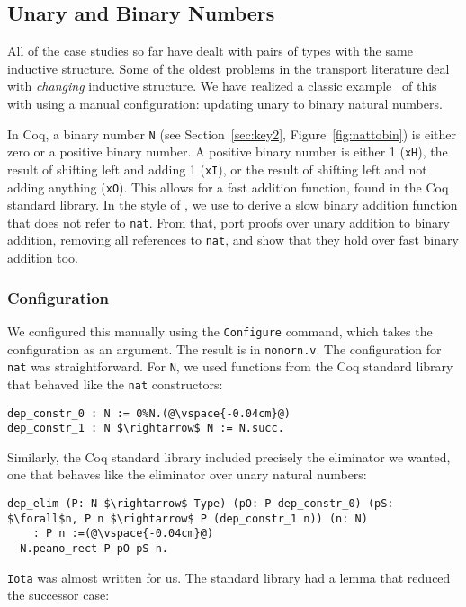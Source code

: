 \subsection{Unary and Binary Numbers}
\label{sec:bin}

All of the case studies so far have dealt with pairs of types with the same inductive structure.
Some of the oldest problems in the transport literature deal with \textit{changing} inductive
structure.
We have realized a classic example~\cite{magaud2000changing}  of this with \toolname using a manual configuration:
updating unary to binary natural numbers.

In Coq, a binary number \lstinline{N} (see Section~\ref{sec:key2}, Figure~\ref{fig:nattobin}) is either zero or a positive binary number. A positive binary number
is either 1 (\lstinline{xH}), the result of shifting left and adding 1 (\lstinline{xI}),
or the result of shifting left and not adding anything (\lstinline{xO}).
This allows for a fast addition function, found in the Coq standard library.
In the style of \citet{magaud2000changing}, we use \toolname to derive a slow binary
addition function that does not refer to \lstinline{nat}.
From that, port proofs over unary addition to binary addition,
removing all references to \lstinline{nat}, and show that they hold over fast binary addition too.

\subsubsection{Configuration}
We configured this manually using the \lstinline{Configure} command,
which takes the configuration as an argument.
The result is in \lstinline{nonorn.v}.
The configuration for \lstinline{nat} was straightforward.
For \lstinline{N}, we used functions from the Coq standard library that
behaved like the \lstinline{nat} constructors:

\begin{lstlisting}
dep_constr_0 : N := 0%N.(@\vspace{-0.04cm}@)
dep_constr_1 : N $\rightarrow$ N := N.succ.
\end{lstlisting}
Similarly, the Coq standard library included precisely the eliminator we wanted, one that behaves
like the eliminator over unary natural numbers:

\begin{lstlisting}
dep_elim (P: N $\rightarrow$ Type) (pO: P dep_constr_0) (pS: $\forall$n, P n $\rightarrow$ P (dep_constr_1 n)) (n: N) 
    : P n :=(@\vspace{-0.04cm}@)
  N.peano_rect P pO pS n.
\end{lstlisting}
\lstinline{Iota} was almost written for us.
The standard library had a lemma that reduced the successor case:

